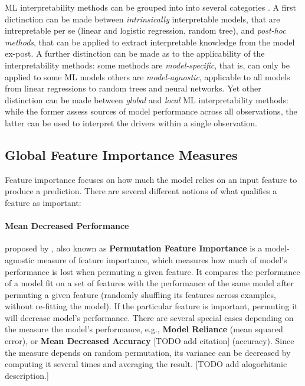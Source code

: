 		ML interpretability methods can be grouped into into several categories \citep{molnar2020interpretable}. A first dictinction can be made between  \textit{intrinsically} interpretable models, that are intrepretable per se (linear and logistic regression, random tree), and \textit{post-hoc methods}, that can be applied to extract interpretable knowledge from the model ex-post. A further distinction can be made as to the applicability of the interpretability methods: some methods are \textit{model-specific}, that is, can only be applied to some ML models others are \textit{model-agnostic}, applicable to all models from linear regressions to random trees and neural networks. Yet other distinction can be made between \textit{global} and \textit{local} ML interpretability methods: while the former assess sources of model performance across all observations, the latter can be used to interpret the drivers within a single observation. 
		
		\subsection{Global Feature Importance Measures}
		
			Feature importance focuses on how much the model relies on an input feature to produce a prediction. There are several different notions of what qualifies a feature as important: 
		
			\paragraph{Mean Decreased Performance} proposed by \citep{fisher2019all}, also known as \textbf{Permutation Feature Importance} is a model-agnostic measure of feature importance, which measures how much of model's performance is lost when permuting a given feature. It compares the performance of a model fit on a set of features with the performance of the same model after permuting a given feature (randomly shuffling its features across examples, without re-fitting the model). If the particular feature is important, permuting it will decrease model's performance. There are several special cases depending on the measure the model's performance, e.g., \textbf{Model Reliance} \citep{fisher2019all} (mean squared error), or \textbf{Mean Decreased Accuracy} [TODO add citation] (accuracy). Since the measure depends on random permutation, its variance can be decreased by computing it several times and averaging the result. [TODO add alogorhitmic description.]	
			
